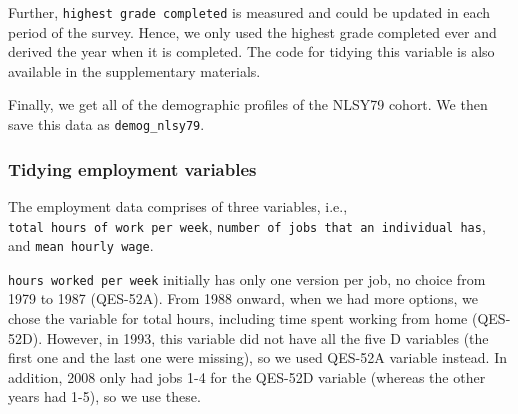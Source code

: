 \documentclass{article}
\begin{document}
Further, \texttt{highest\ grade\ completed} is measured and could be updated in each period of the survey. Hence, we only used the highest grade completed ever and derived the year when it is completed. The code for tidying this variable is also available in the supplementary materials.

Finally, we get all of the demographic profiles of the NLSY79 cohort. We then save this data as \texttt{demog\_nlsy79}.

\hypertarget{tidying-employment-variables}{%
\subsubsection{Tidying employment variables}\label{tidying-employment-variables}}

The employment data comprises of three variables, i.e., \texttt{total\ hours\ of\ work\ per\ week}, \texttt{number\ of\ jobs\ that\ an\ individual\ has}, and \texttt{mean\ hourly\ wage}.

\texttt{hours\ worked\ per\ week} initially has only one version per job, no choice from 1979 to 1987 (QES-52A). From 1988 onward, when we had more options, we chose the variable for total hours, including time spent working from home (QES-52D). However, in 1993, this variable did not have all the five D variables (the first one and the last one were missing), so we used QES-52A variable instead. In addition, 2008 only had jobs 1-4 for the QES-52D variable (whereas the other years had 1-5), so we use these.
\end{document}

